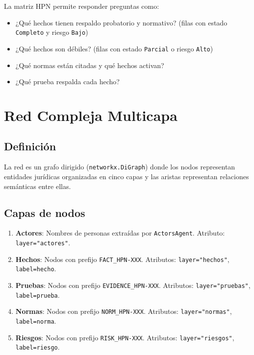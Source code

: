 \documentclass[12pt, letterpaper]{article}
\begin{document}
La matriz HPN permite responder preguntas como:
\begin{itemize}[nosep]
  \item ¿Qué hechos tienen respaldo probatorio y normativo?
    (filas con estado \texttt{Completo} y riesgo \texttt{Bajo})
  \item ¿Qué hechos son débiles?
    (filas con estado \texttt{Parcial} o riesgo \texttt{Alto})
  \item ¿Qué normas están citadas y qué hechos activan?
  \item ¿Qué prueba respalda cada hecho?
\end{itemize}

\newpage
\section{Red Compleja Multicapa}

\subsection{Definición}

La red es un grafo dirigido (\texttt{networkx.DiGraph}) donde los
nodos representan entidades jurídicas organizadas en cinco capas y
las aristas representan relaciones semánticas entre ellas.

\subsection{Capas de nodos}

\begin{enumerate}[nosep]
  \item \textbf{Actores}: Nombres de personas extraídas por
    \texttt{ActorsAgent}. Atributo: \texttt{layer="actores"}.
  \item \textbf{Hechos}: Nodos con prefijo \texttt{FACT\_HPN-XXX}.
    Atributos: \texttt{layer="hechos"}, \texttt{label=hecho}.
  \item \textbf{Pruebas}: Nodos con prefijo \texttt{EVIDENCE\_HPN-XXX}.
    Atributos: \texttt{layer="pruebas"}, \texttt{label=prueba}.
  \item \textbf{Normas}: Nodos con prefijo \texttt{NORM\_HPN-XXX}.
    Atributos: \texttt{layer="normas"}, \texttt{label=norma}.
  \item \textbf{Riesgos}: Nodos con prefijo \texttt{RISK\_HPN-XXX}.
    Atributos: \texttt{layer="riesgos"}, \texttt{label=riesgo}.
\end{enumerate}
\end{document}
